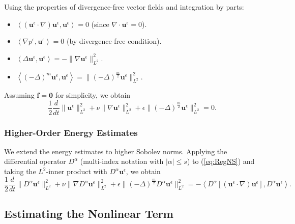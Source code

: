 \documentclass[11pt]{article}
\begin{document}
Using the properties of divergence-free vector fields and integration by parts:

\begin{itemize}[itemsep=0pt]
    \item $\left\langle (\mathbf{u}^\epsilon \cdot \nabla) \mathbf{u}^\epsilon, \mathbf{u}^\epsilon \right\rangle = 0$ (since $\nabla \cdot \mathbf{u}^\epsilon = 0$).
    \item $\left\langle \nabla p^\epsilon, \mathbf{u}^\epsilon \right\rangle = 0$ (by divergence-free condition).
    \item $\left\langle \Delta \mathbf{u}^\epsilon, \mathbf{u}^\epsilon \right\rangle = - \| \nabla \mathbf{u}^\epsilon \|_{L^2}^2$.
    \item $\left\langle (-\Delta)^m \mathbf{u}^\epsilon, \mathbf{u}^\epsilon \right\rangle = \| (-\Delta)^{\frac{m}{2}} \mathbf{u}^\epsilon \|_{L^2}^2$.
\end{itemize}

Assuming $\mathbf{f} = \mathbf{0}$ for simplicity, we obtain
\begin{equation}
\frac{1}{2} \frac{d}{dt} \| \mathbf{u}^\epsilon \|_{L^2}^2 + \nu \| \nabla \mathbf{u}^\epsilon \|_{L^2}^2 + \epsilon \| (-\Delta)^{\frac{m}{2}} \mathbf{u}^\epsilon \|_{L^2}^2 = 0.
\label{eq:EnergyL2}
\end{equation}

\subsubsection{Higher-Order Energy Estimates}

We extend the energy estimates to higher Sobolev norms. Applying the differential operator $D^\alpha$ (multi-index notation with $|\alpha| \leq s$) to (\ref{eq:RegNS}) and taking the $L^2$-inner product with $D^\alpha \mathbf{u}^\epsilon$, we obtain
\begin{equation}
\frac{1}{2} \frac{d}{dt} \| D^\alpha \mathbf{u}^\epsilon \|_{L^2}^2 + \nu \| \nabla D^\alpha \mathbf{u}^\epsilon \|_{L^2}^2 + \epsilon \| (-\Delta)^{\frac{m}{2}} D^\alpha \mathbf{u}^\epsilon \|_{L^2}^2 = - \left\langle D^\alpha [(\mathbf{u}^\epsilon \cdot \nabla) \mathbf{u}^\epsilon], D^\alpha \mathbf{u}^\epsilon \right\rangle.
\label{eq:EnergyHs}
\end{equation}

\subsection{Estimating the Nonlinear Term}
\end{document}
